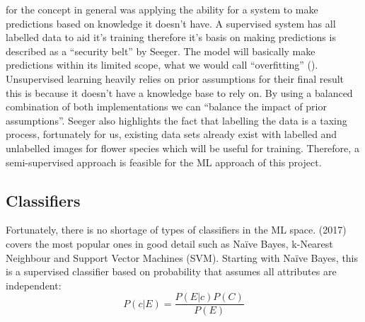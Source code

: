 \documentclass{article}
\begin{document}
 for the concept in general was applying the ability for a system to make predictions based on knowledge it doesn’t 
 have. A supervised system has all labelled data to aid it’s training therefore it’s basis on making predictions is 
 described as a “security belt” by Seeger. The model will basically make predictions within its limited scope, what we 
 would call “overfitting” (\cite{tom1995}). Unsupervised learning heavily relies on prior assumptions for their final 
 result this is because it doesn’t have a knowledge base to rely on. By using a balanced combination of both 
 implementations we can “balance the impact of prior assumptions”. Seeger also highlights the fact that labelling the 
 data is a taxing process, fortunately for us, existing data sets already exist with labelled and unlabelled images for 
 flower species which will be useful for training. Therefore, a semi-supervised approach is feasible for the ML approach
  of this project.

  \subsection{Classifiers}
  Fortunately, there is no shortage of types of classifiers in the ML space. \citeauthor{MohammedMohssen2017Ml:a} (2017) covers the most popular 
  ones in good detail such as Naïve Bayes, k-Nearest Neighbour and Support Vector Machines (SVM). Starting with Naïve 
  Bayes, this is a supervised classifier based on probability that assumes all attributes are independent:
  \begin{equation}
    P(c|E) = \frac{P(E|c)P(C)}{P(E)}
  \end{equation}
\end{document}
